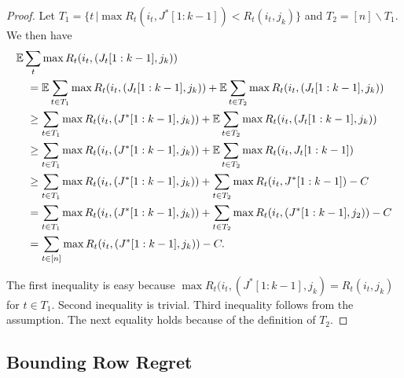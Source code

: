 \begin{proof}
 Let $T_1 = \{ t \, | \max R_t(i_t,J^*[1:k-1]) < R_t(i_t,j_k) \}$ and $T_2 = [n] \backslash T_1 .$ We then have 
\begin{align*}
  & \mathbb{E} \sum_t \max R_t(i_t,(J_t[1:k-1],j_k)) \\
  & \quad = \mathbb{E}\sum_{t \in T_1} \max R_t(i_t,(J_t[1:k-1],j_k)) + \mathbb{E}\sum_{t \in T_2} \max R_t(i_t,(J_t[1:k-1],j_k)) \\
  & \quad \geq \sum_{t \in T_1} \max R_t(i_t,(J^*[1:k-1],j_k)) + \mathbb{E}\sum_{t \in T_2} \max R_t(i_t,(J_t[1:k-1],j_k)) \\
  & \quad \geq \sum_{t \in T_1} \max R_t(i_t,(J^*[1:k-1],j_k)) + \mathbb{E}\sum_{t \in T_2} \max R_t(i_t,J_t[1:k-1]) \\
  & \quad \geq \sum_{t \in T_1} \max R_t(i_t,(J^*[1:k-1],j_k)) + \sum_{t \in T_2} \max R_t(i_t,J^*[1:k-1]) - C \\
  & \quad = \sum_{t \in T_1} \max R_t(i_t,(J^*[1:k-1],j_k)) + \sum_{t \in T_2} \max R_t(i_t,(J^*[1:k-1],j_2)) - C \\
  & \quad = \sum_{t \in [n]} \max R_t(i_t,(J^*[1:k-1],j_k)) - C.
\end{align*}

The first inequality is easy because $\max R_t(i_t,(J^*[1:k-1],j_k) = R_t(i_t,j_k)$ for $t \in T_1$. Second inequality is trivial. Third inequality follows from the assumption. The next equality holds because of the definition of $T_2$.  
\end{proof}


\subsection{Bounding Row Regret}

